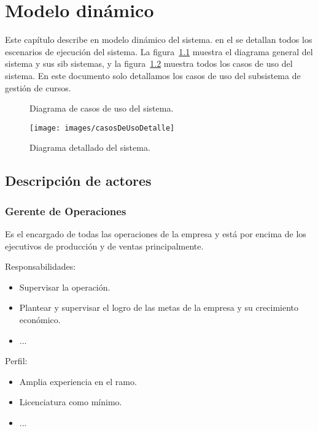 \chapter{Modelo dinámico}	
\label{cap:modDinamico}

	Este capítulo describe en modelo dinámico del sistema. en el se detallan todos los escenarios de ejecución del sistema. La figura~\ref{fig:casosDeUso} muestra el diagrama general del sistema y sus sib sistemas, y la figura~\ref{fig:casosDeUsoDetalle} muestra todos los casos de uso del sistema. En este documento solo detallamos los casos de uso del subsistema de gestión de cursos.
	
\begin{figure}[htbp]
	\begin{center}
		\caption{Diagrama de casos de uso del sistema.}
		\label{fig:casosDeUso}
	\end{center}
\end{figure}

\begin{figure}[htbp]
	\begin{center}
		\texttt{[image: images/casosDeUsoDetalle]}
		\caption{Diagrama detallado del sistema.}
		\label{fig:casosDeUsoDetalle}
	\end{center}
\end{figure}

\section{Descripción de actores}

\begin{Usuario}{\hypertarget{getenteOperaciones}{\subsection{Gerente de Operaciones}}}{
	Es el encargado de todas las operaciones de la empresa y está por encima de los ejecutivos de producción y de ventas principalmente.
}
    \item[Responsabilidades:] \cdtEmpty
    \begin{itemize}
		\item Supervisar la operación.
		\item Plantear y supervisar el logro de las metas de la empresa y su crecimiento económico.
		\item ...
    \end{itemize}

	\item[Perfil:] \cdtEmpty
    \begin{itemize}
		\item Amplia experiencia en el ramo.
		\item Licenciatura como mínimo.
		\item ...
    \end{itemize}
\end{Usuario}

